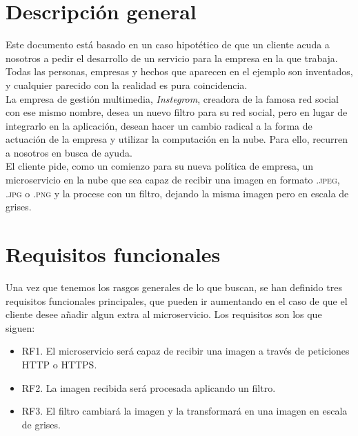 \documentclass[11pt,a4paper]{article}
\begin{document}
\newpage

\section{Descripción general}
Este documento está basado en un caso hipotético de que un cliente acuda a nosotros a pedir el desarrollo de un servicio para la empresa en la que trabaja. Todas las personas, empresas y hechos que aparecen en el ejemplo son inventados, y cualquier parecido con la realidad es pura coincidencia.\\

La empresa de gestión multimedia, \textit{Instegrom}, creadora de la famosa red social con ese mismo nombre, desea un nuevo filtro para su red social, pero en lugar de integrarlo en la aplicación, desean hacer un cambio radical a la forma de actuación de la empresa y utilizar la computación en la nube. Para ello, recurren a nosotros en busca de ayuda.\\

El cliente pide, como un comienzo para su nueva política de empresa, un microservicio en la nube que sea capaz de recibir una imagen en formato \textsc{.jpeg}, \textsc{.jpg} o \textsc{.png} y la procese con un filtro, dejando la misma imagen pero en escala de grises.

\section{Requisitos funcionales}
Una vez que tenemos los rasgos generales de lo que buscan, se han definido tres requisitos funcionales principales, que pueden ir aumentando en el caso de que el cliente desee añadir algun extra al microservicio. Los requisitos son los que siguen:

\begin{itemize}
	\item RF1. El microservicio será capaz de recibir una imagen a través de peticiones \textsc{HTTP} o \textsc{HTTPS}.
	\item RF2. La imagen recibida será procesada aplicando un filtro.
	\item RF3. El filtro cambiará la imagen y la transformará en una imagen en escala de grises.
\end{itemize}
\end{document}
